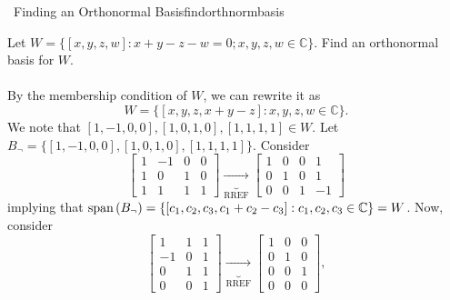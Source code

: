         \pagebreak
        \begin{example}{\Difficulty\,\Difficulty\,\,Finding an Orthonormal Basis}{findorthnormbasis}

            Let \(W=\{[x,y,z,w]:x+y-z-w=0;x,y,z,w\in\mathbb{C}\}\). Find an orthonormal basis for \(W\).
            \\
            \\
            By the membership condition of \(W\), we can rewrite it as
            \begin{equation*}
                W=\{[x,y,z,x+y-z]:x,y,z,w\in\mathbb{C}\}.
            \end{equation*}
            We note that \([1,-1,0,0],[1,0,1,0],[1,1,1,1]\in W\). Let \(B_\neg=\{[1,-1,0,0],[1,0,1,0],[1,1,1,1]\}\). Consider
            \begin{equation*}
                \begin{bmatrix}
                    1 & -1 & 0 & 0 \\
                    1 & 0 & 1 & 0 \\
                    1 & 1 & 1 & 1
                \end{bmatrix}\underbrace{\to}_\text{RREF}
                \begin{bmatrix}
                    1 & 0 & 0 & 1 \\
                    0 & 1 & 0 & 1 \\
                    0 & 0 & 1 & -1
                \end{bmatrix}
            \end{equation*}
            implying that \(\text{span\,}(B_\neg)=\{[c_1,c_2,c_3,c_1+c_2-c_3]:c_1,c_2,c_3\in\mathbb{C}\}=W\). Now, consider
            \begin{equation*}
                \begin{bmatrix}
                    1 & 1 & 1 \\
                    -1 & 0 & 1 \\
                    0 & 1 & 1 \\
                    0 & 0 & 1
                \end{bmatrix}\underbrace{\to}_\text{RREF}
                \begin{bmatrix}
                    1 & 0 & 0 \\
                    0 & 1 & 0 \\
                    0 & 0 & 1 \\
                    0 & 0 & 0
                \end{bmatrix},

\end{equation*}
\end{example}
